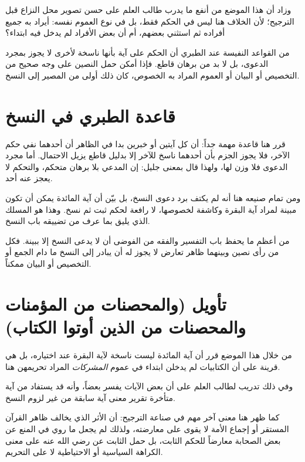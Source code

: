 وزاد أن هذا الموضع من أنفع ما يدرب طالب العلم على حسن تصوير محل النزاع قبل الترجيح؛ لأن الخلاف هنا ليس في الحكم فقط، بل في نوع العموم نفسه: أيراد به جميع أفراده ثم استثني بعضهم، أم أن بعض الأفراد لم يدخل فيه ابتداء؟

\begin{fawaid}
من القواعد النفيسة عند الطبري أن الحكم على آية بأنها ناسخة لأخرى لا يجوز بمجرد الدعوى، بل لا بد من برهان قاطع. فإذا أمكن حمل النصين على وجه صحيح من التخصيص أو البيان أو العموم المراد به الخصوص، كان ذلك أولى من المصير إلى النسخ.
\end{fawaid}

\section{قاعدة الطبري في النسخ}
قرر  هنا قاعدة مهمة جداً: أن كل آيتين أو خبرين بدا في الظاهر أن أحدهما نفي حكم الآخر، فلا يجوز الجزم بأن أحدهما ناسخ للآخر إلا بدليل قاطع يزيل الاحتمال. أما مجرد الدعوى فلا وزن لها، ولهذا قال بمعنى جليل: إن المدعي بلا برهان متحكم، والتحكم لا يعجز عنه أحد.

ومن تمام صنيعه هنا أنه لم يكتف برد دعوى النسخ، بل بيّن أن آية المائدة يمكن أن تكون مبينة لمراد آية البقرة وكاشفة لخصوصها، لا رافعة لحكم ثبت ثم نسخ. وهذا هو المسلك الذي يليق بما عرف من تضييقه باب النسخ.

\begin{fawaid}
من أعظم ما يحفظ باب التفسير والفقه من الفوضى أن لا يدعى النسخ إلا ببينة. فكل من رأى نصين وبينهما ظاهر تعارض لا يجوز له أن يبادر إلى النسخ ما دام الجمع أو التخصيص أو البيان ممكناً.
\end{fawaid}

\separator

\section{تأويل (والمحصنات من المؤمنات والمحصنات من الذين أوتوا الكتاب)}
من خلال هذا الموضع قرر  أن آية المائدة ليست ناسخة لآية البقرة عند اختياره، بل هي قرينة على أن الكتابيات لم يدخلن ابتداء في عموم \textit{المشركات} المراد تحريمهن هنا.

وفي ذلك تدريب لطالب العلم على أن بعض الآيات يفسر بعضاً، وأنه قد يستفاد من آية متأخرة تقرير معنى آية سابقة من غير لزوم النسخ.

كما ظهر هنا معنى آخر مهم في صناعة الترجيح: أن الأثر الذي يخالف ظاهر القرآن المستقر أو إجماع الأمة لا يقوى على معارضته، ولذلك لم يجعل  ما روي في المنع عن بعض الصحابة معارضاً للحكم الثابت، بل حمل الثابت عن  رضي الله عنه على معنى الكراهة السياسية أو الاحتياطية لا على التحريم.

